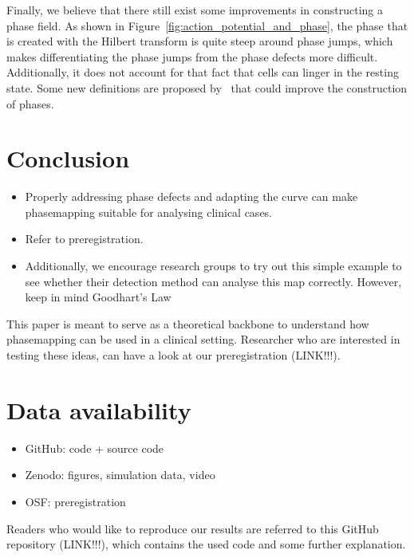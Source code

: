 \documentclass[twocolumn]{article}
\begin{document}
Finally, we believe that there still exist some improvements in
constructing a phase field.
As shown in Figure~\ref{fig:action_potential_and_phase},
the phase that is created with the Hilbert transform is quite steep
around phase jumps,
which makes differentiating the phase jumps from the phase defects
more difficult.
Additionally, it does not account for that fact that cells can linger
in the resting state.
Some new definitions are proposed by~\cite{kabus2022numerical} that
could improve the construction of phases.

\section{Conclusion}\label{conclusion}

\begin{itemize}
    \tightlist
  \item
    Properly addressing phase defects and adapting the curve can make
    phasemapping suitable for analysing clinical cases.
  \item
    Refer to preregistration.
  \item
    Additionally, we encourage research groups to try out this simple
    example to see whether their detection method can analyse this map
    correctly. However, keep in mind Goodhart's Law
\end{itemize}

This paper is meant to serve as a theoretical backbone to understand how
phasemapping can be used in a clinical setting. Researcher who are
interested in testing these ideas, can have a look at our
preregistration (LINK!!!).

\section{Data availability}\label{data-availability}

\begin{itemize}
    \tightlist
  \item
    GitHub: code + source code
  \item
    Zenodo: figures, simulation data, video
  \item
    OSF: preregistration
\end{itemize}

Readers who would like to reproduce our results are referred to this
GitHub repository (LINK!!!), which contains the used code and some
further explanation.

\printbibliography
\end{document}

